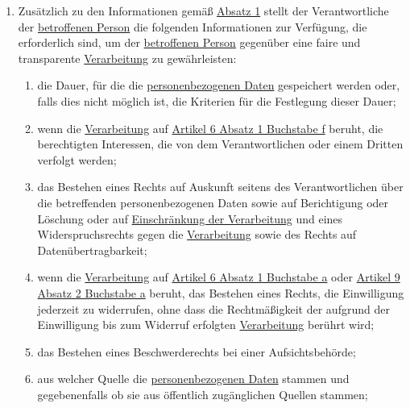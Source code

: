 \begin{enumerate}
\begin{enumerate}
  \end{enumerate}

  \item Zusätzlich zu den Informationen gemäß \hyperref[itm:14-1]{Absatz 1} stellt der Verantwortliche der \hyperref[itm:04-1]{betroffenen
   Person} die folgenden Informationen zur Verfügung, die erforderlich sind, um der \hyperref[itm:04-1]{betroffenen Person} gegenüber eine
   faire und transparente \hyperref[itm:04-2]{Verarbeitung} zu gewährleisten:
  \label{itm:14-2}

  \begin{enumerate}
  
    \item die Dauer, für die die \hyperref[itm:04-1]{personenbezogenen Daten} gespeichert werden oder, falls dies nicht möglich ist, die
     Kriterien für die Festlegung dieser Dauer;
    \label{itm:14-2a}

    \item wenn die \hyperref[itm:04-2]{Verarbeitung} auf \hyperref[itm:06-1f]{Artikel 6 Absatz 1 Buchstabe f} beruht, die berechtigten
     Interessen, die von dem Verantwortlichen oder einem Dritten verfolgt werden;
    \label{itm:14-2b}

    \item das Bestehen eines Rechts auf Auskunft seitens des Verantwortlichen über die betreffenden personenbezogenen
     Daten sowie auf Berichtigung oder Löschung oder auf \hyperref[itm:04-3]{Einschränkung der Verarbeitung} und eines Widerspruchsrechts
     gegen die \hyperref[itm:04-2]{Verarbeitung} sowie des Rechts auf Datenübertragbarkeit;
    \label{itm:14-2c}

    \item wenn die \hyperref[itm:04-2]{Verarbeitung} auf \hyperref[itm:06-1a]{Artikel 6 Absatz 1 Buchstabe a} oder \hyperref[itm:09-2a]
     {Artikel 9 Absatz 2 Buchstabe a} beruht, das Bestehen eines Rechts, die Einwilligung jederzeit zu widerrufen, ohne
     dass die Rechtmäßigkeit der aufgrund der Einwilligung bis zum Widerruf erfolgten \hyperref[itm:04-2]{Verarbeitung} berührt wird;
    \label{itm:14-2d}

    \item das Bestehen eines Beschwerderechts bei einer Aufsichtsbehörde;
    \label{itm:14-2e}

    \item aus welcher Quelle die \hyperref[itm:04-1]{personenbezogenen Daten} stammen und gegebenenfalls ob sie aus öffentlich zugänglichen
     Quellen stammen;
    \label{itm:14-2f}


\end{enumerate}
\end{enumerate}
